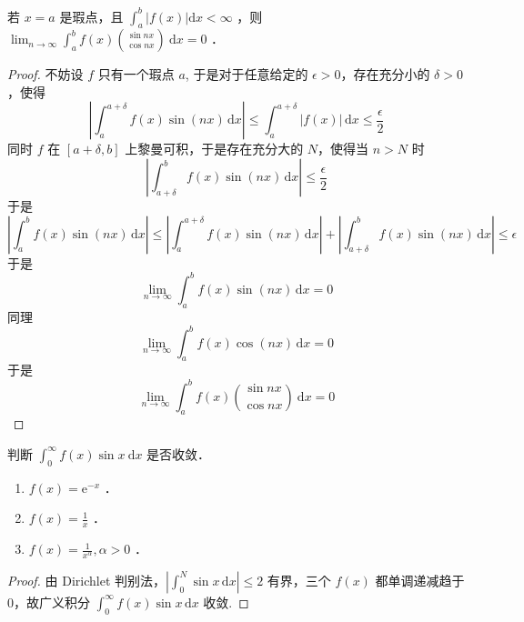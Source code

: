 \begin{exercise}
若 $x=a$ 是瑕点，且 $\int_a^b|f(x)| \mathrm{d} x<\infty$ ，则 $\lim _{n \rightarrow \infty} \int_a^b f(x)\binom{\sin n x}{\cos n x} \mathrm{~d} x=0$ ．
\end{exercise}
\begin{proof}
不妨设 $f$ 只有一个瑕点 $a$, 于是对于任意给定的 $\epsilon>0$，存在充分小的 $\delta>0$，使得
\[
\left\lvert  \int_{a}^{a+\delta} f(x)\sin(nx) \, \mathrm{d}x   \right\rvert \leq \int_{a}^{a+\delta} \lvert f(x) \rvert  \, \mathrm{d}x\leq \frac{\epsilon}{2}
\]
同时 $f$ 在 $[a+\delta,b]$ 上黎曼可积，于是存在充分大的 $N$，使得当 $n>N$ 时
\[
\left\lvert  \int_{a+\delta}^{b} f(x)\sin(nx) \, \mathrm{d}x  \right\rvert \leq \frac{\epsilon}{2}
\]
于是
\[
\left\lvert  \int_{a}^{b} f(x)\sin(nx) \, \mathrm{d}x   \right\rvert \leq \left\lvert  \int_{a}^{a+\delta} f(x)\sin(nx) \, \mathrm{d}x   \right\rvert +\left\lvert  \int_{a+\delta}^{b} f(x)\sin(nx) \, \mathrm{d}x   \right\rvert \leq \epsilon
\]
于是
\[
\lim_{ n \to \infty } \int_{a}^{b} f(x)\sin(nx) \, \mathrm{d}x =0
\]
同理
\[
\lim_{ n \to \infty } \int_{a}^{b} f(x)\cos(nx) \, \mathrm{d}x =0
\]
于是
\[
\lim _{n \rightarrow \infty} \int_a^b f(x)\binom{\sin n x}{\cos n x} \mathrm{~d} x=0
\]
\end{proof}

\begin{exercise}
判断 $\int_0^{\infty} f(x) \sin x \mathrm{~d} x$ 是否收敛．
	\begin{enumerate}
		\item $f(x)=\mathrm{e}^{-x}$ ．
		\item $f(x)=\frac{1}{x}$ ．
		\item $f(x)=\frac{1}{x^\alpha}, \alpha>0$ ．
	\end{enumerate}
\end{exercise}
\begin{proof}
由 Dirichlet 判别法，$\left\lvert  \int_{0}^{N} \sin x \, \mathrm{d}x  \right\rvert\leq2$ 有界，三个 $f(x)$ 都单调递减趋于 0，故广义积分 $\int_{0}^{\infty} f(x)\sin x \, \mathrm{d}x$ 收敛.
\end{proof}

